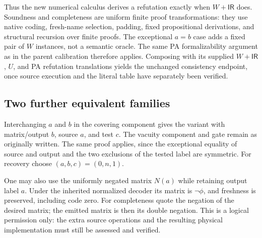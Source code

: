 Thus the new numerical calculus derives a refutation exactly when
$W+\mathsf{IR}$ does. Soundness and completeness are uniform finite
proof transformations: they use native coding, fresh-name selection,
padding, fixed propositional derivations, and structural recursion over
finite proofs. The exceptional $a=b$ case adds a fixed pair of $W$
instances, not a semantic oracle. The same PA formalizability argument
as in the parent calibration therefore applies. Composing with its
supplied $W+\mathsf{IR}$, $U$, and PA refutation translations yields
the unchanged consistency endpoint, once source execution and the
literal table have separately been verified.

\subsection{Two further equivalent families}

Interchanging $a$ and $b$ in the covering component gives the variant
with matrix/output $b$, source $a$, and test $c$. The vacuity component
and gate remain as originally written. The same proof applies, since
the exceptional equality of source and output and the two exclusions
of the tested label are symmetric. For recovery choose $(a,b,c)=(0,n,1)$.

One may also use the uniformly negated matrix $N(a)$ while retaining
output label $a$. Under the inherited normalized decoder its matrix
is $\neg\phi$, and freshness is preserved, including code zero.
For completeness quote the negation of the desired matrix; the emitted
matrix is then its double negation. This is a logical permission only:
the extra source operations and the resulting physical implementation
must still be assessed and verified.
